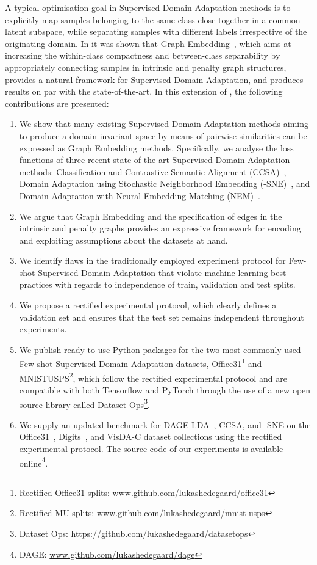 \documentclass[journal]{IEEEtran}
\begin{document}
A typical optimisation goal in Supervised Domain Adaptation methods is to explicitly map samples belonging to the same class close together in a common latent subspace, while separating samples with different labels irrespective of the originating domain. 
In \cite{hedegaard2020supervised} it was shown that Graph Embedding~\cite{yan2006mfa}, which aims at increasing the within-class compactness and between-class separability by appropriately connecting samples in intrinsic and penalty graph structures, provides a natural framework for Supervised Domain Adaptation, and produces results on par with the state-of-the-art. 
In this extension of \cite{hedegaard2020supervised}, the following contributions are presented:
\begin{enumerate}
    \item We show that many existing Supervised Domain Adaptation methods aiming to produce a domain-invariant space by means of pairwise similarities can be expressed as Graph Embedding methods. Specifically, we analyse the loss functions of three recent state-of-the-art Supervised Domain Adaptation methods: Classification and Contrastive Semantic Alignment (CCSA)~\cite{motiian2017ccsa}, Domain Adaptation using Stochastic Neighborhood Embedding (-SNE)~\cite{xu2019dsne}, and Domain Adaptation with Neural Embedding Matching (NEM)~\cite{wang2019nem}.
    \item We argue that Graph Embedding and the specification of edges in the intrinsic and penalty graphs provides an expressive framework for encoding and exploiting assumptions about the datasets at hand.
    \item We identify flaws in the traditionally employed experiment protocol for Few-shot Supervised Domain Adaptation that violate machine learning best practices with regards to independence of train, validation and test splits.
    \item We propose a rectified experimental protocol, which clearly defines a validation set and ensures that the test set remains independent throughout experiments.
    \item We publish ready-to-use Python packages for the two most commonly used Few-shot Supervised Domain Adaptation datasets, Office31\footnote{Rectified Office31 splits: \url{www.github.com/lukashedegaard/office31}} and MNISTUSPS\footnote{Rectified MU splits: \url{www.github.com/lukashedegaard/mnist-usps}}, which follow the rectified experimental protocol and are compatible with both Tensorflow and PyTorch through the use of a new open source library called Dataset Ops\footnote{Dataset Ops: \url{https://github.com/lukashedegaard/datasetops}}.
    \item We supply an updated benchmark for DAGE-LDA~\cite{hedegaard2020supervised}, CCSA, and -SNE on the Office31~\cite{saenko2010adapting}, Digits~\cite{lecun1998gradient, lecun90handwritten, netzer2011reading, ganin2016domain}, and VisDA-C\cite{peng2018visda} dataset collections using the rectified experimental protocol. The source code of our experiments is available online\footnote{DAGE: \url{www.github.com/lukashedegaard/dage}}.
\end{enumerate}
\end{document}
